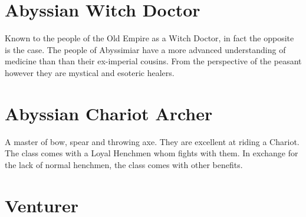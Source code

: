 \section{Abyssian Witch Doctor} Known to the people of the Old Empire as a Witch Doctor, in fact the opposite is the case. The people of Abyssimiar have a more advanced understanding of medicine than than their ex-imperial cousins. From the perspective of the peasant however they are mystical and esoteric healers. 
\section{Abyssian Chariot Archer} 
A master of bow, spear and throwing axe. They are excellent at riding a Chariot. The class comes with a Loyal Henchmen whom fights with them. In exchange for the lack of normal henchmen, the class comes with other benefits.
\section{Venturer}
